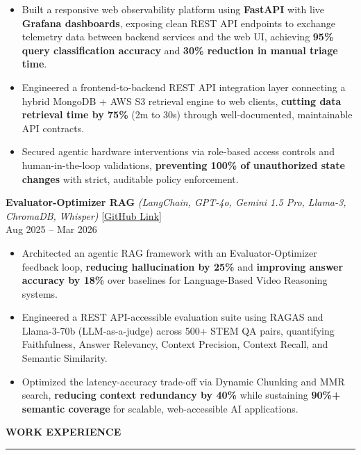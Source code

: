 \documentclass[letterpaper,10.5pt]{extarticle}
\newcommand{\resumesection}[1]{%
    \vspace{6pt}%
    \noindent\textbf{#1}\vspace{-5pt}%
    \\\noindent\rule{\textwidth}{0.5pt}%
    \vspace{1pt}%
}
\begin{document}
\begin{itemize}[leftmargin=12pt, topsep=1pt, itemsep=0pt, parsep=0pt]
    \item Built a responsive web observability platform using \textbf{FastAPI} with live \textbf{Grafana dashboards}, exposing clean REST API endpoints to exchange telemetry data between backend services and the web UI, achieving \textbf{95\% query classification accuracy} and \textbf{30\% reduction in manual triage time}.
    \item Engineered a frontend-to-backend REST API integration layer connecting a hybrid MongoDB + AWS S3 retrieval engine to web clients, \textbf{cutting data retrieval time by 75\%} (2m to 30s) through well-documented, maintainable API contracts.
    \item Secured agentic hardware interventions via role-based access controls and human-in-the-loop validations, \textbf{preventing 100\% of unauthorized state changes} with strict, auditable policy enforcement.
\end{itemize}

\vspace{4pt}

\noindent\textbf{Evaluator-Optimizer RAG}
\textit{(LangChain, GPT-4o, Gemini 1.5 Pro, Llama-3, ChromaDB, Whisper)} \hfill \href{https://github.com/slowloris-98/Evaluator-Optimizer-RAG}{[GitHub Link]} \\
Aug 2025 -- Mar 2026

\begin{itemize}[leftmargin=12pt, topsep=1pt, itemsep=0pt, parsep=0pt]
    \item Architected an agentic RAG framework with an Evaluator-Optimizer feedback loop, \textbf{reducing hallucination by 25\%} and \textbf{improving answer accuracy by 18\%} over baselines for Language-Based Video Reasoning systems.
    \item Engineered a REST API-accessible evaluation suite using RAGAS and Llama-3-70b (LLM-as-a-judge) across 500+ STEM QA pairs, quantifying Faithfulness, Answer Relevancy, Context Precision, Context Recall, and Semantic Similarity.
    \item Optimized the latency-accuracy trade-off via Dynamic Chunking and MMR search, \textbf{reducing context redundancy by 40\%} while sustaining \textbf{90\%+ semantic coverage} for scalable, web-accessible AI applications.
\end{itemize}

\resumesection{WORK EXPERIENCE}
\end{document}
